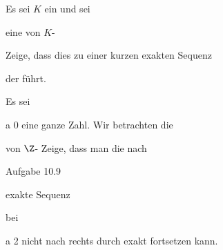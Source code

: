 {}
{





Es sei $K$ ein
 und sei

 {  }

eine
von
$K$-

 Zeige, dass dies zu einer kurzen exakten Sequenz

 {  }

der
führt.





}
{} {}

{}
{





Es sei

\mavergleichskette
{\vergleichskette
{a
}
{ \neq }{ 0
}
{  }{
}
{    }{
}
{   }{
}
}
{}{}{}
eine ganze Zahl. Wir betrachten die

 {  }

von
$\Z$-
Zeige, dass man die nach

Aufgabe 10.9

exakte Sequenz

 {  }

bei

\mavergleichskette
{\vergleichskette
{a
}
{ \geq }{ 2
}
{  }{
}
{    }{
}
{   }{
}
}
{}{}{}
nicht nach rechts durch
 exakt fortsetzen kann.





}
{} {}

